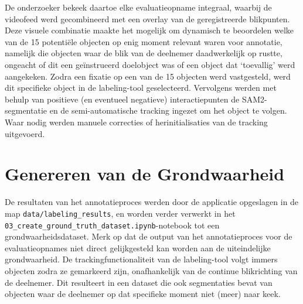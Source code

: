 De onderzoeker bekeek daartoe elke evaluatieopname integraal, waarbij de videofeed werd gecombineerd met een overlay 
van de geregistreerde blikpunten. Deze visuele combinatie maakte het mogelijk om dynamisch te beoordelen welke van de 15 potentiële 
objecten op enig moment relevant waren voor annotatie, namelijk die objecten waar de blik van de deelnemer daadwerkelijk op rustte, 
ongeacht of dit een geïnstrueerd doelobject was of een object dat `toevallig' werd aangekeken. 
Zodra een fixatie op een van de 15 objecten werd vastgesteld, werd dit specifieke object in de labeling-tool geselecteerd. 
Vervolgens werden met behulp van positieve (en eventueel negatieve) interactiepunten de SAM2-segmentatie en de semi-automatische 
tracking ingezet om het object te volgen. Waar nodig werden manuele correcties of herinitialisaties van de tracking uitgevoerd.


\section{Genereren van de Grondwaarheid}

De resultaten van het annotatieproces werden door de applicatie opgeslagen in de map \texttt{data/labeling\_results}, en worden 
verder verwerkt in het \texttt{03\_create\_ground\_truth\_dataset.ipynb}-notebook tot een grondwaarheidsdataset.
Merk op dat de output van het annotatieproces voor de evaluatieopnames niet direct gelijkgesteld kan worden aan de uiteindelijke grondwaarheid. 
De trackingfunctionaliteit van de labeling-tool volgt immers objecten zodra ze gemarkeerd zijn, onafhankelijk van de continue blikrichting van de deelnemer. 
Dit resulteert in een dataset die ook segmentaties bevat van objecten waar de deelnemer op dat specifieke moment niet (meer) naar keek.

